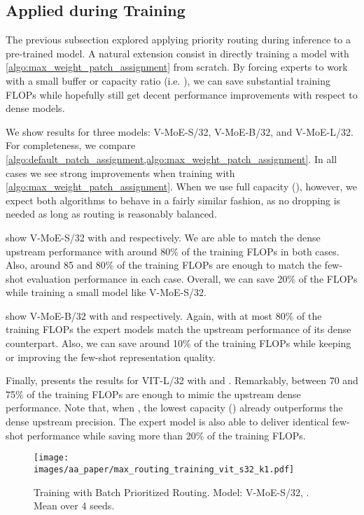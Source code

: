 \documentclass{article}
\newcommand{\abbv}{{V-MoE}}
\newcommand{\maxrouting}{Batch Prioritized Routing}
\begin{document}
\clearpage
\subsection{Applied during Training}

The previous subsection explored applying priority routing during inference to a pre-trained model.
A natural extension consist in directly training a model with \cref{algo:max_weight_patch_assignment} from scratch.
By forcing experts to work with a small buffer or capacity ratio (i.e. ), we can save substantial training FLOPs while hopefully still get decent performance improvements with respect to dense models.

We show results for three models: \abbv{}-S/32, \abbv{}-B/32, and \abbv{}-L/32.
For completeness, we compare \cref{algo:default_patch_assignment,algo:max_weight_patch_assignment}.
In all cases we see strong improvements when training with \cref{algo:max_weight_patch_assignment}.
When we use full capacity (), however, we expect both algorithms to behave in a fairly similar fashion, as no dropping is needed as long as routing is reasonably balanced.

 show \abbv{}-S/32 with  and  respectively.
We are able to match the dense upstream performance with around 80\% of the training FLOPs in both cases.
Also, around 85 and 80\% of the training FLOPs are enough to match the few-shot evaluation performance in each case.
Overall, we can save 20\% of the FLOPs while training a small model like \abbv{}-S/32.


 show \abbv{}-B/32 with  and  respectively.
Again, with at most 80\% of the training FLOPs the expert models match the upstream performance of its dense counterpart.
Also, we can save around 10\% of the training FLOPs while keeping or improving the few-shot representation quality.

Finally,  presents the results for VIT-L/32 with  and .
Remarkably, between 70 and 75\% of the training FLOPs are enough to mimic the upstream dense performance.
Note that, when , the lowest capacity () already outperforms the dense upstream precision.
The expert model is also able to deliver identical few-shot performance while saving more than 20\% of the training FLOPs.

\begin{figure}[h]
\centering
\texttt{[image: images/aa\_paper/max\_routing\_training\_vit\_s32\_k1.pdf]}
\caption{Training with \maxrouting{}. Model: \abbv{}-S/32, . Mean over 4 seeds.}
\label{im:training_max_routing_vit_s_k1}
\end{figure}
\end{document}
